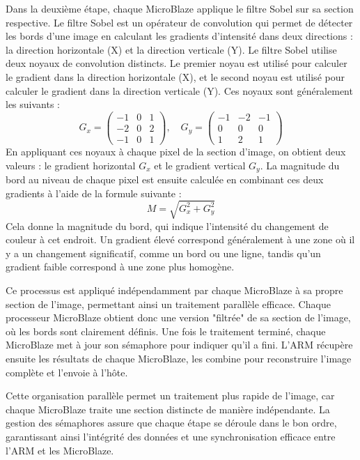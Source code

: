 \documentclass[../CSC_5RO07_TA.tex]{subfiles}
\begin{document}
\vspace{1em} 

Dans la deuxième étape, chaque MicroBlaze applique le filtre Sobel sur sa section respective. Le filtre Sobel est un opérateur de convolution qui permet de détecter les bords d'une image en calculant les gradients d'intensité dans deux directions : la direction horizontale (X) et la direction verticale (Y). Le filtre Sobel utilise deux noyaux de convolution distincts. Le premier noyau est utilisé pour calculer le gradient dans la direction horizontale (X), et le second noyau est utilisé pour calculer le gradient dans la direction verticale (Y). Ces noyaux sont généralement les suivants :
\[
G_x = \begin{pmatrix} -1 & 0 & 1 \\ -2 & 0 & 2 \\ -1 & 0 & 1 \end{pmatrix}, \quad
G_y = \begin{pmatrix} -1 & -2 & -1 \\ 0 & 0 & 0 \\ 1 & 2 & 1 \end{pmatrix}
\]
En appliquant ces noyaux à chaque pixel de la section d'image, on obtient deux valeurs : le gradient horizontal \( G_x \) et le gradient vertical \( G_y \). La magnitude du bord au niveau de chaque pixel est ensuite calculée en combinant ces deux gradients à l'aide de la formule suivante :
\[
M = \sqrt{G_x^2 + G_y^2}
\]
Cela donne la magnitude du bord, qui indique l'intensité du changement de couleur à cet endroit. Un gradient élevé correspond généralement à une zone où il y a un changement significatif, comme un bord ou une ligne, tandis qu'un gradient faible correspond à une zone plus homogène.

\vspace{1em} 

Ce processus est appliqué indépendamment par chaque MicroBlaze à sa propre section de l'image, permettant ainsi un traitement parallèle efficace. Chaque processeur MicroBlaze obtient donc une version "filtrée" de sa section de l'image, où les bords sont clairement définis. Une fois le traitement terminé, chaque MicroBlaze met à jour son sémaphore pour indiquer qu'il a fini. L'ARM récupère ensuite les résultats de chaque MicroBlaze, les combine pour reconstruire l'image complète et l'envoie à l'hôte.

\vspace{1em} 

Cette organisation parallèle permet un traitement plus rapide de l'image, car chaque MicroBlaze traite une section distincte de manière indépendante. La gestion des sémaphores assure que chaque étape se déroule dans le bon ordre, garantissant ainsi l'intégrité des données et une synchronisation efficace entre l'ARM et les MicroBlaze.
\end{document}

